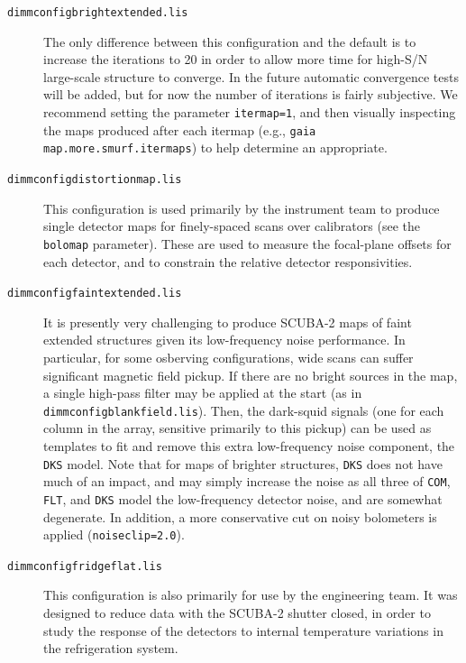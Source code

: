 \documentclass[twoside,11pt]{article}
\renewcommand{\_}{\texttt{\symbol{95}}}
\begin{document}
\begin{description}
\item[\texttt{dimmconfig\_bright\_extended.lis}] The only difference
  between this configuration and the default is to increase the
  iterations to 20 in order to allow more time for high-S/N
  large-scale structure to converge. In the future automatic
  convergence tests will be added, but for now the number of
  iterations is fairly subjective. We recommend setting the parameter
  \texttt{itermap=1}, and then visually inspecting the maps produced
  after each itermap (e.g., \texttt{gaia map.more.smurf.itermaps}) to
  help determine an appropriate.

\item[\texttt{dimmconfig\_distortionmap.lis}] This configuration is
  used primarily by the instrument team to produce single detector
  maps for finely-spaced scans over calibrators (see the
  \texttt{bolomap} parameter). These are used to measure the
  focal-plane offsets for each detector, and to constrain the relative
  detector responsivities.

\item[\texttt{dimmconfig\_faint\_extended.lis}] It is presently very
  challenging to produce SCUBA-2 maps of faint extended structures
  given its low-frequency noise performance. In particular, for some
  osberving configurations, wide scans can suffer significant magnetic
  field pickup. If there are no bright sources in the map, a single
  high-pass filter may be applied at the start (as in
  \texttt{dimmconfig\_blank\_field.lis}). Then, the dark-squid signals
  (one for each column in the array, sensitive primarily to this
  pickup) can be used as templates to fit and remove this extra
  low-frequency noise component, the \texttt{DKS} model. Note that for
  maps of brighter structures, \texttt{DKS} does not have much of an
  impact, and may simply increase the noise as all three of
  \texttt{COM}, \texttt{FLT}, and \texttt{DKS} model the low-frequency
  detector noise, and are somewhat degenerate.  In addition, a more
  conservative cut on noisy bolometers is applied
  (\texttt{noiseclip=2.0}).

\item[\texttt{dimmconfig\_fridgeflat.lis}] This configuration is also
  primarily for use by the engineering team. It was designed to reduce
  data with the SCUBA-2 shutter closed, in order to study the response
  of the detectors to internal temperature variations in the
  refrigeration system.


\end{description}
\end{document}
